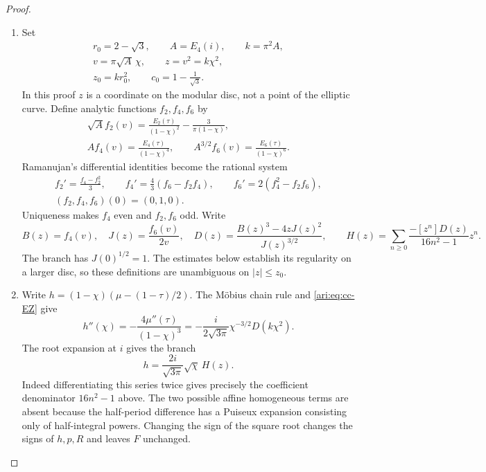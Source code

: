 \begin{proof}
\begin{enumerate}[label=\arabic*.,leftmargin=*]
\item Set
\[
 \begin{gathered}
 r_0=2-\sqrt3,\qquad A=E_4(i),\qquad k=\pi^2A,\\
 v=\pi\sqrt A\,\chi,\qquad z=v^2=k\chi^2,\\
 z_0=kr_0^2,\qquad c_0=1-\frac1{\sqrt3}.
 \end{gathered}
\]
In this proof $z$ is a coordinate on the modular disc, not a
point of the elliptic curve. Define analytic functions $f_2,f_4,f_6$
by
\[
 \begin{gathered}
 \sqrt A f_2(v)=\frac{E_2(\tau)}{(1-\chi)^2}
                         -\frac3{\pi(1-\chi)},\\
 A f_4(v)=\frac{E_4(\tau)}{(1-\chi)^4},\qquad
 A^{3/2} f_6(v)=\frac{E_6(\tau)}{(1-\chi)^6}.
 \end{gathered}
\]
Ramanujan's differential identities become the rational system
\begin{equation}\label{ari:eq:cc-ode}
 \begin{gathered}
 f_2'=\frac{f_4-f_2^2}{3},\qquad
 f_4'=\frac43(f_6-f_2f_4),\qquad
 f_6'=2(f_4^2-f_2f_6),\\
 (f_2,f_4,f_6)(0)=(0,1,0).
 \end{gathered}
\end{equation}
Uniqueness makes $f_4$ even and $f_2,f_6$ odd. Write
\[
 B(z)=f_4(v),\quad J(z)=\frac{f_6(v)}{2v},\quad
 D(z)=\frac{B(z)^3-4zJ(z)^2}{J(z)^{3/2}},\qquad
 H(z)=\sum_{n\ge0}\frac{-[z^n]D(z)}{16n^2-1}z^n.
\]
The branch has $J(0)^{1/2}=1$. The estimates below establish
its regularity on a larger disc, so these definitions are
unambiguous on $|z|\le z_0$.

\item Write $h=(1-\chi)(\mu-(1-\tau)/2)$. The Möbius chain rule and
\eqref{ari:eq:cc-EZ} give
\[
 h''(\chi)=-\frac{4\mu''(\tau)}{(1-\chi)^3}
       =-\frac{i}{2\sqrt{3\pi}}\chi^{-3/2}D(k\chi^2).
\]
The root expansion at $i$ gives the branch
\begin{equation}\label{ari:eq:cc-h}
 h=\frac{2i}{\sqrt{3\pi}}\sqrt \chi\,H(z).
\end{equation}
Indeed differentiating this series twice gives precisely the
coefficient denominator $16n^2-1$ above. The two possible affine
homogeneous terms are absent because the half-period difference
has a Puiseux expansion consisting only of half-integral powers.
Changing the sign of the square root changes the signs of $h,p,R$
and leaves $F$ unchanged.


\end{enumerate}
\end{proof}
